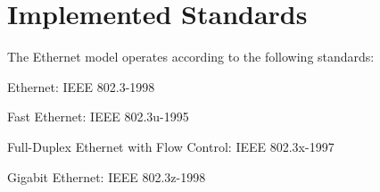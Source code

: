 \section{Implemented Standards}

The Ethernet model operates according to the following standards:

\begin{compactitem}
  \item Ethernet: IEEE 802.3-1998
  \item Fast Ethernet: IEEE 802.3u-1995
  \item Full-Duplex Ethernet with Flow Control: IEEE 802.3x-1997
  \item Gigabit Ethernet: IEEE 802.3z-1998
\end{compactitem}

